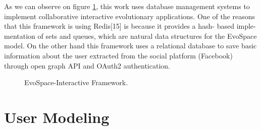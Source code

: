 As we can observe on figure \ref{fig:ESFramework}, this work uses database
management systems to implement collaborative interactive evolutionary
applications. One of the reasons that this framework is using Redis[15] is
because it provides a hash- based imple-mentation of sets and queues, which are
natural data structures for the EvoSpace model. On the other hand this framework
uses a relational database to save basic information about the user extracted
from the social platform (Facebook) through open graph API and OAuth2
authentication.
\begin{figure}
	\captionsetup{justification=centering,margin=2cm}
	\centering
	\setlength\fboxsep{0pt}
	\setlength\fboxrule{0.7pt}
	\caption{EvoSpace-Interactive Framework.}
	\label{fig:ESFramework}
\end{figure}

\section{User Modeling}


